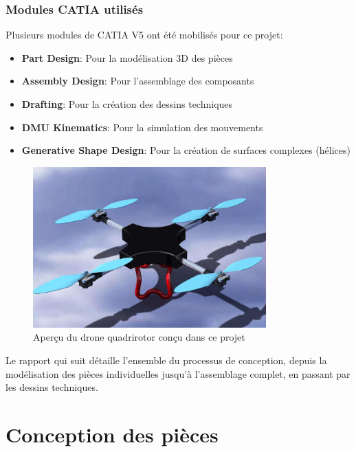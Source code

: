 \documentclass[a4paper,12pt]{report}
\begin{document}
\subsection{Modules CATIA utilisés}
Plusieurs modules de CATIA V5 ont été mobilisés pour ce projet:
\begin{itemize}
    \item \textbf{Part Design}: Pour la modélisation 3D des pièces
    \item \textbf{Assembly Design}: Pour l'assemblage des composants
    \item \textbf{Drafting}: Pour la création des dessins techniques
    \item \textbf{DMU Kinematics}: Pour la simulation des mouvements
    \item \textbf{Generative Shape Design}: Pour la création de surfaces complexes (hélices)
\end{itemize}


\begin{figure}[H]
    \centering
    \includegraphics[width=0.8\textwidth]{images/drone_apercu.png}
    \caption{Aperçu du drone quadrirotor conçu dans ce projet}
    \label{fig:drone_apercu}
\end{figure}

Le rapport qui suit détaille l'ensemble du processus de conception, depuis la modélisation des pièces individuelles jusqu'à l'assemblage complet, en passant par les dessins techniques.

\chapter{Conception des pièces}
\end{document}
